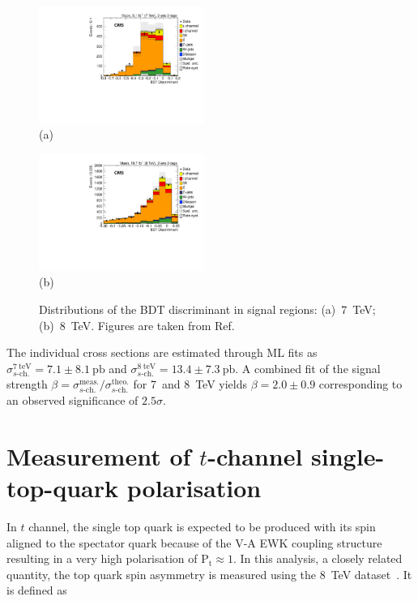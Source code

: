 \documentclass{PoS}
\begin{document}
\begin{figure}[htbp]
\begin{center}
\parbox[t]{0.49\textwidth}{\centering\includegraphics[width=0.48\textwidth]{figures/schannel/mu_7TeV_BDT_signal.pdf}\\(a)}
\parbox[t]{0.49\textwidth}{\centering\includegraphics[width=0.48\textwidth]{figures/schannel/mu_8TeV_BDT_signal.pdf}\\(b)}
\caption{\label{fig:schannel-BDT}Distributions of the BDT discriminant in signal regions: (a)~7~TeV; (b)~8~TeV. Figures are taken from Ref.~\cite{CMS-PAS-TOP-13-009}}
\end{center}
\end{figure}

The individual cross sections are estimated through ML fits as $\sigma^\mathrm{7~teV}_{s\mbox{-}\mathrm{ch.}}=7.1\pm8.1~\mathrm{pb}$ and $\sigma^\mathrm{8~teV}_{s\mbox{-}\mathrm{ch.}}=13.4\pm7.3~\mathrm{pb}$. A combined fit of the signal strength $\beta=\sigma^\mathrm{meas.}_{s\mbox{-}\mathrm{ch.}}/\sigma^\mathrm{theo.}_{s\mbox{-}\mathrm{ch.}}$ for 7~and 8~TeV yields $\beta=2.0\pm0.9$ corresponding to an observed significance of $2.5\sigma$.




\section{Measurement of $t$-channel single-top-quark polarisation}

In $t$ channel, the single top quark is expected to be produced with its spin aligned to the spectator quark because of the V-A EWK coupling structure resulting in a very high polarisation of $\mathrm{P_t}\approx1$. In this analysis, a closely related quantity, the top quark spin asymmetry is measured using the 8~TeV dataset~\cite{CMS-PAS-TOP-13-001}. It is defined as 
\end{document}
